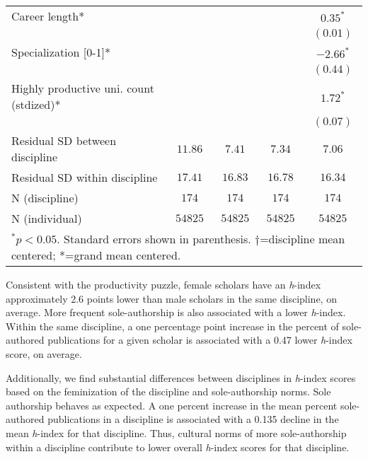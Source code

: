 \documentclass[
  10pt,
  letterpaper,
]{article}
\begin{document}
\begin{table}[!t]
\begin{center}
\begin{tabular}{l c c c c}
Career length*                          &             &              &              & $0.35^{*}$   \\
                                        &             &              &              & $(0.01)$     \\
Specialization [0-1]*                   &             &              &              & $-2.66^{*}$  \\
                                        &             &              &              & $(0.44)$     \\
Highly productive uni. count (stdized)* &             &              &              & $1.72^{*}$   \\
                                        &             &              &              & $(0.07)$     \\
\hline
Residual SD between discipline          & $11.86$     & $7.41$       & $7.34$       & $7.06$       \\
Residual SD within discipline           & $17.41$     & $16.83$      & $16.78$      & $16.34$      \\
N (discipline)                          & $174$       & $174$        & $174$        & $174$        \\
N (individual)                          & $54825$     & $54825$      & $54825$      & $54825$      \\
\hline
\multicolumn{5}{l}{\scriptsize{$^{*}p<0.05$. Standard errors shown in parenthesis. $\dagger$=discipline mean centered; *=grand mean centered.}}
\end{tabular}
\label{table:coefficients}
\end{center}
\end{table}

Consistent with the productivity puzzle, female scholars have an
\emph{h}-index approximately 2.6 points lower than male scholars in the
same discipline, on average. More frequent sole-authorship is also
associated with a lower \emph{h}-index. Within the same discipline, a
one percentage point increase in the percent of sole-authored
publications for a given scholar is associated with a 0.47 lower
\emph{h}-index score, on average.

Additionally, we find substantial differences between disciplines in
\emph{h}-index scores based on the feminization of the discipline and
sole-authorship norms. Sole authorship behaves as expected. A one
percent increase in the mean percent sole-authored publications in a
discipline is associated with a 0.135 decline in the mean \emph{h}-index
for that discipline. Thus, cultural norms of more sole-authorship within
a discipline contribute to lower overall \emph{h}-index scores for that
discipline.
\end{document}
